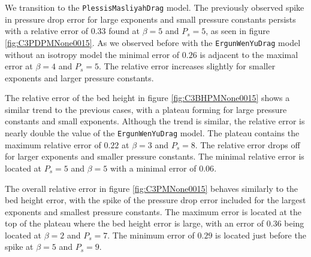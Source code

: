We transition to the \lstinline|PlessisMasliyahDrag| model. 
The previously observed spike in pressure drop error for large exponents and small pressure constants persists with a relative error of $0.33$ found at $\beta = 5$ and $P_s = 5$, as seen in figure \ref{fig:C3PDPMNone0015}.
As we observed before with the \lstinline|ErgunWenYuDrag| model without an isotropy model the minimal error of $0.26$ is adjacent to the maximal error at $\beta = 4$ and $P_s = 5$. The relative error increases slightly for smaller exponents and larger pressure constants.

The relative error of the bed height in figure \ref{fig:C3BHPMNone0015} shows a similar trend to the previous cases, with a plateau forming for large pressure constants and small exponents. Although the trend is similar, the relative error is nearly double the value of the \lstinline|ErgunWenYuDrag| model. The plateau contains the maximum relative error of $0.22$ at $\beta = 3$ and $P_s = 8$. The relative error drops off for larger exponents and smaller pressure constants. The minimal relative error is located at $P_s = 5$ and $\beta = 5$ with a minimal error of $0.06$.

The overall relative error in figure \ref{fig:C3PMNone0015} behaves similarly to the bed height error, with the spike of the pressure drop error included for the largest exponents and smallest pressure constants.
The maximum error is located at the top of the plateau where the bed height error is large, with an error of $0.36$ being located at $\beta = 2$ and $P_s = 7$.
The minimum error of $0.29$ is located just before the spike at $\beta = 5$ and $P_s = 9$.

